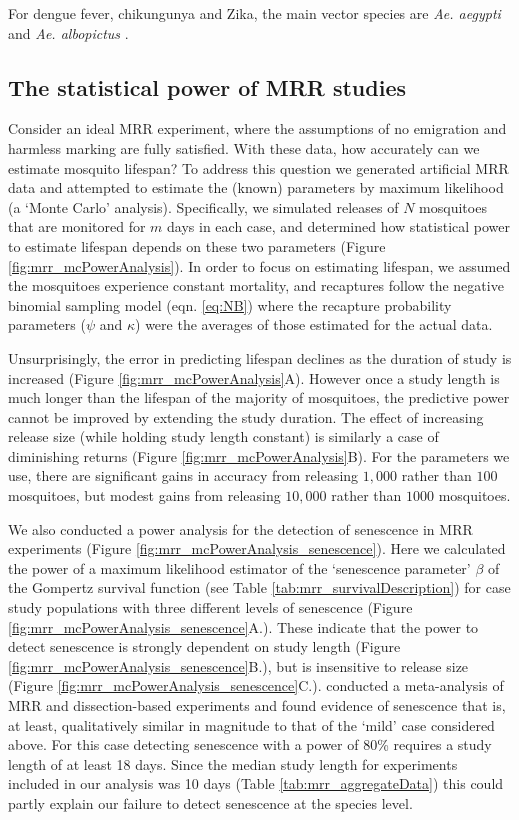 \documentclass[12pt]{article}
\begin{document}
{For dengue fever, chikungunya and Zika, the main vector species are \textit{Ae. aegypti} and \textit{Ae. albopictus} \citep{kraemer2015global,grard2014zika,benelli2016declining}. 

\subsection{The statistical power of MRR studies}\label{sec:mrr_discussion_MonteCarlo}
Consider an ideal MRR experiment, where the assumptions of no emigration and harmless marking are fully satisfied. With these data, how accurately can we estimate mosquito lifespan? To address this question we generated artificial MRR data and attempted to estimate the (known) parameters by maximum likelihood (a `Monte Carlo' analysis). Specifically, we simulated releases of $N$ mosquitoes that are monitored for $m$ days in each case, and determined how statistical power to estimate lifespan depends on these two parameters (Figure \ref{fig:mrr_mcPowerAnalysis}). In order to focus on estimating lifespan, we assumed the mosquitoes experience constant mortality, and recaptures follow the negative binomial sampling model (eqn. \ref{eq:NB}) where the recapture probability parameters ($\psi$ and $\kappa$) were the averages of those estimated for the actual data.

Unsurprisingly, the error in predicting lifespan declines as the duration of study is increased (Figure \ref{fig:mrr_mcPowerAnalysis}A). However once a study length is much longer than the lifespan of the majority of mosquitoes, the predictive power cannot be improved by extending the study duration. The effect of increasing release size (while holding study length constant) is similarly a case of diminishing returns (Figure \ref{fig:mrr_mcPowerAnalysis}B). For the parameters we use, there are significant gains in accuracy from releasing $1,000$ rather than $100$ mosquitoes, but modest gains from releasing $10,000$ rather than $1000$ mosquitoes.

We also conducted a power analysis for the detection of senescence in MRR experiments (Figure \ref{fig:mrr_mcPowerAnalysis_senescence}). Here we calculated the power of a maximum likelihood estimator of the `senescence parameter' $\beta$ of the Gompertz survival function (see Table \ref{tab:mrr_survivalDescription}) for case study populations with three different levels of senescence (Figure \ref{fig:mrr_mcPowerAnalysis_senescence}A.). These indicate that the power to detect senescence is strongly dependent on study length (Figure \ref{fig:mrr_mcPowerAnalysis_senescence}B.), but is insensitive to release size (Figure \ref{fig:mrr_mcPowerAnalysis_senescence}C.). \cite{clements1981analysis} conducted a meta-analysis of MRR and dissection-based experiments and found evidence of senescence that is, at least, qualitatively similar in magnitude to that of the `mild' case considered above. For this case detecting senescence with a power of 80\% requires a study length of at least 18 days. Since the median study length for experiments included in our analysis was 10 days (Table \ref{tab:mrr_aggregateData}) this could partly explain our failure to detect senescence at the species level.




}
\end{document}

